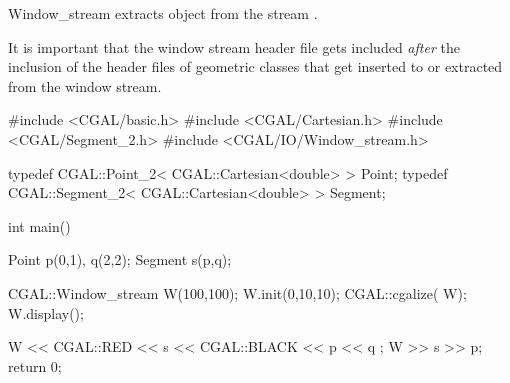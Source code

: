 \begin{ccClass} {Window_stream}
       {extracts object  from the stream \ccVar.}

\ccExample

It is important that the window stream header file gets included
{\em after} the inclusion of the header files of geometric classes
that get inserted to or extracted from the window stream.

\begin{cprog}

#include <CGAL/basic.h>
#include <CGAL/Cartesian.h>
#include <CGAL/Segment_2.h>
#include <CGAL/IO/Window_stream.h>

typedef CGAL::Point_2< CGAL::Cartesian<double> >     Point;
typedef CGAL::Segment_2< CGAL::Cartesian<double> >   Segment;

int main()
{
    Point p(0,1), q(2,2);
    Segment s(p,q);

    CGAL::Window_stream W(100,100);
    W.init(0,10,10);
    CGAL::cgalize( W);
    W.display();

    W << CGAL::RED << s << CGAL::BLACK << p << q ;
    W >> s >> p;
    return 0;
}
\end{cprog} 

\end{ccClass} 
